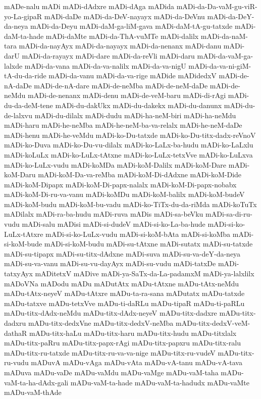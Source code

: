 {mADe-nalu
mADi
mADi-dAdxre
mADi-dAga
mADida
mADi-da-Da-vaM-gu-viR-yo-La-gipaR
mADi-daDe
mADi-da-DeV-nayayx
mADi-da-DeVnu
mADi-da-DeY-da-neya
mADi-da-Deyu
mADi-daM-ga-liM-gava
mADi-daM-tA-gu-tatxde
mADi-daM-ta-hade
mADi-daMte
mADi-da-ThA-vuMTe
mADi-dalilx
mADi-da-naM-tara
mADi-da-nayAyx
mADi-da-nayayx
mADi-da-nenanx
mADi-danu
mADi-darU
mADi-da-rayayx
mADi-dare
mADi-da-reVli
mADi-daru
mADi-da-vaM-ga-lalxde
mADi-da-vana
mADi-da-va-nalilx
mADi-da-va-nigU
mADi-da-va-ni-giM-tA-du-da-ride
mADi-da-vanu
mADi-da-va-rige
mADide
mADidedxV
mADi-de-nA-daDe
mADi-de-nA-dare
mADi-de-neMba
mADi-de-neM-daDe
mADi-de-neMdu
mADi-de-nenanx
mADi-denu
mADi-de-veM-baru
mADi-di-rAgi
mADi-du-da-deM-tene
mADi-du-dakUkx
mADi-du-dakekx
mADi-du-danunx
mADi-du-de-lalxvu
mADi-du-dilalx
mADi-dudu
mADi-ha-neM-biri
mADi-ha-neMdu
mADi-haru
mADi-he-neMba
mADi-he-neM-ba-va-relalx
mADi-he-neM-daDe
mADi-henu
mADi-he-veMdu
mADi-ko-Du-tatxde
mADi-ko-Du-titx-dadx-reVnoV
mADi-ko-Duva
mADi-ko-Du-vu-dilalx
mADi-ko-LaLx-ba-hudu
mADi-ko-LaLxlu
mADi-koLuLx
mADi-ko-LuLx-tAtxne
mADi-ko-LuLx-tetxVve
mADi-ko-LuLxva
mADi-ko-LuLx-vudu
mADi-koMDa
mADi-koM-Dalilx
mADi-koM-Dare
mADi-koM-Daru
mADi-koM-Da-va-reMba
mADi-koM-Di-dAdxne
mADi-koM-Dide
mADi-koM-Dipapx
mADi-koM-Di-papx-nalalx
mADi-koM-Di-papx-nobabx
mADi-koM-Di-ru-va-vanu
mADi-koMDu
mADi-koM-balilx
mADi-koM-budeV
mADi-koM-budu
mADi-koM-bu-vadu
mADi-ko-TiTx-du-da-riMda
mADi-koTuTx
mADilalx
mADi-ra-ba-hudu
mADi-ruva
mADis
mADi-sa-beVku
mADi-sa-di-ru-vudu
mADi-salu
mADisi
mADi-si-dudeV
mADi-si-ko-La-ba-hude
mADi-si-ko-LuLx-tAtxre
mADi-si-ko-LuLx-vudu
mADi-si-koM-bAta
mADi-si-koMba
mADi-si-koM-bude
mADi-si-koM-budu
mADi-su-tAtxne
mADi-sutatx
mADi-su-tatxde
mADi-su-tipapx
mADi-su-titx-dAdxne
mADi-suva
mADi-su-va-deY-da-neya
mADi-su-va-vanu
mADi-su-vu-dayAyx
mADi-su-vudu
mADi-tatxDe
mADi-tatxyAyx
mADitetxV
mADive
mADi-ya-SaTx-da-La-padamxM
mADi-ya-lalxlilx
mADoVNa
mADodu
mADu
mADutAtx
mADu-tAtxne
mADu-tAtx-neMdu
mADu-tAtx-neyeV
mADu-tAtxre
mADu-ta-ra-sana
mADutatx
mADu-tatxde
mADu-tatxve
mADu-tetxVve
mADu-ti-daRLu
mADu-tipaR
mADu-ti-paRLu
mADu-titx-dAdx-neMdu
mADu-titx-dAdx-neyeV
mADu-titx-dadxre
mADu-titx-dadxru
mADu-titx-dedxVne
mADu-titx-dedxV-neMba
mADu-titx-dedxV-veM-dathaR
mADu-titx-haLu
mADu-titx-haru
mADu-titx-hudu
mADu-titxlalx
mADu-titx-paRru
mADu-titx-papx-rAgi
mADu-titx-papxru
mADu-titx-ralu
mADu-titx-ru-tatxde
mADu-titx-ru-va-va-nige
mADu-titx-ru-vudeV
mADu-titx-ru-vudu
mADuvA
mADu-vAga
mADu-vAta
mADu-vA-tanu
mADu-vA-tava
mADuva
mADu-vaDe
mADu-vaMdu
mADu-vaMge
mADu-vaM-taha
mADu-vaM-ta-ha-dAdx-gali
mADu-vaM-ta-hade
mADu-vaM-ta-hadudx
mADu-vaMte
mADu-vaM-thAde
}
